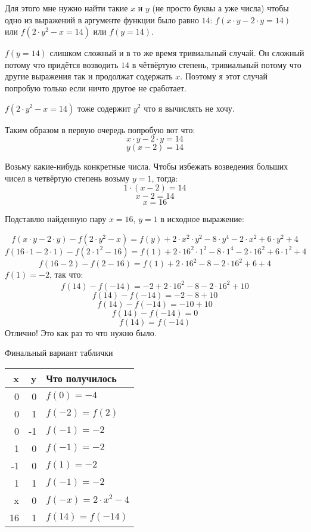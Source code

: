 \documentclass{article}
\begin{document}
Для этого мне нужно найти такие $x$ и $y$ (не просто буквы а уже числа) чтобы одно из выражений в аргументе функции было равно $14$: $f(x\cdot{}y-2\cdot{}y=14)$ или $f(2\cdot{}y^2-x=14)$ или $f(y=14)$.

$f(y=14)$ слишком сложный и в то же время тривиальный случай. Он сложный потому что придётся возводить $14$ в чётвёртую степень, тривиальный потому что другие выражения так и продолжат содержать $x$. Поэтому я этот случай попробую только если ничто другое не сработает.

$f(2\cdot{}y^2-x=14)$ тоже содержит $y^2$ что я вычислять не хочу. 

Таким образом в первую очередь попробую вот что:
$$x\cdot{}y-2\cdot{}y=14$$
$$y(x-2)=14$$

Возьму какие-нибудь конкретные числа. Чтобы избежать возведения больших чисел в четвёртую степень возьму $y=1$, тогда:
$$1\cdot{}(x-2)=14$$
$$x-2=14$$
$$x=16$$

Подставлю найденную пару $x=16$, $y=1$ в исходное выражение:

$$f(x\cdot{}y-2\cdot{}y)-f(2\cdot{}y^2-x)=f(y)+2\cdot{}x^2\cdot{}y^2-8\cdot{}y^4-2\cdot{}x^2+6\cdot{}y^2+4$$
$$f(16\cdot{}1-2\cdot{}1)-f(2\cdot{}1^2-16)=f(1)+2\cdot{}16^2\cdot{}1^2-8\cdot{}1^4-2\cdot{}16^2+6\cdot{}1^2+4$$
$$f(16-2)-f(2-16)=f(1)+2\cdot{}16^2-8-2\cdot{}16^2+6+4$$
$f(1)=-2$, так что:
$$f(14)-f(-14)=-2+2\cdot{}16^2-8-2\cdot{}16^2+10$$
$$f(14)-f(-14)=-2-8+10$$
$$f(14)-f(-14)=-10+10$$
$$f(14)-f(-14)=0$$
$$f(14)=f(-14)$$
Отлично! Это как раз то что нужно было.
\begin{samepage}
Финальный вариант таблички
\begin{center}
 \begin{tabular}{r r l} 
 \hline
 x & y & Что получилось        \\
 \hline
  0 &  0 & $f(0)=-4$           \\
  0 &  1 & $f(-2)=f(2)$        \\
  0 & -1 & $f(-1)=-2$          \\
  1 &  0 & $f(-1)=-2$          \\
 -1 &  0 & $f(1)=-2$           \\
  1 &  1 & $f(-1)=-2$          \\
  x &  0 & $f(-x)=2\cdot{}x^2-4$ \\
 16 &  1 & $f(14)=f(-14)$ \\
 \hline
 \end{tabular}
\end{center}
\end{samepage}
\end{document}
